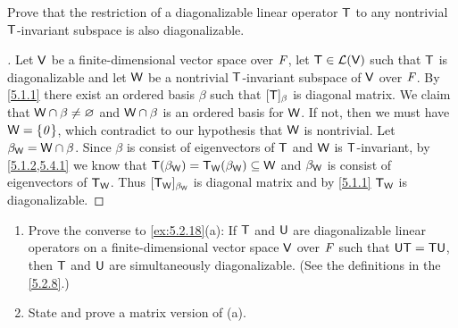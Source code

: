 \begin{ex}\label{ex:5.4.24}
  Prove that the restriction of a diagonalizable linear operator \(\mathsf{T}\) to any nontrivial \(\mathsf{T}\)-invariant subspace is also diagonalizable.
\end{ex}

\begin{proof}[]
  Let \(\mathsf{V}\) be a finite-dimensional vector space over \(\mathit{F}\), let \(\mathsf{T} \in \mathcal{L}(\mathsf{V})\) such that \(\mathsf{T}\) is diagonalizable and let \(\mathsf{W}\) be a nontrivial \(\mathsf{T}\)-invariant subspace of \(\mathsf{V}\) over \(\mathit{F}\).
  By \cref{5.1.1} there exist an ordered basis \(\beta\) such that \([\mathsf{T}]_{\beta}\) is diagonal matrix.
  We claim that \(\mathsf{W} \cap \beta \neq \varnothing\) and \(\mathsf{W} \cap \beta\) is an ordered basis for \(\mathsf{W}\).
  If not, then we must have \(\mathsf{W} = \left\lbrace\mathit{0}\right\rbrace\), which contradict to our hypothesis that \(\mathsf{W}\) is nontrivial.
  Let \(\beta_{\mathsf{W}} = \mathsf{W} \cap \beta\).
  Since \(\beta\) is consist of eigenvectors of \(\mathsf{T}\) and \(\mathsf{W}\) is \(\mathsf{T}\)-invariant, by \cref{5.1.2,5.4.1} we know that \(\mathsf{T}(\beta_{\mathsf{W}}) = \mathsf{T}_{\mathsf{W}}(\beta_{\mathsf{W}}) \subseteq \mathsf{W}\) and \(\beta_{\mathsf{W}}\) is consist of eigenvectors of \(\mathsf{T}_{\mathsf{W}}\).
  Thus \([\mathsf{T}_{\mathsf{W}}]_{\beta_{\mathsf{W}}}\) is diagonal matrix and by \cref{5.1.1} \(\mathsf{T}_{\mathsf{W}}\) is diagonalizable.
\end{proof}

\begin{ex}\label{ex:5.4.25}
  \begin{enumerate}
    \item Prove the converse to \cref{ex:5.2.18}(a):
          If \(\mathsf{T}\) and \(\mathsf{U}\) are diagonalizable linear operators on a finite-dimensional vector space \(\mathsf{V}\) over \(\mathit{F}\) such that \(\mathsf{U} \mathsf{T} = \mathsf{T} \mathsf{U}\), then \(\mathsf{T}\) and \(\mathsf{U}\) are simultaneously diagonalizable.
          (See the definitions in the \cref{5.2.8}.)
    \item State and prove a matrix version of (a).
  \end{enumerate}
\end{ex}


